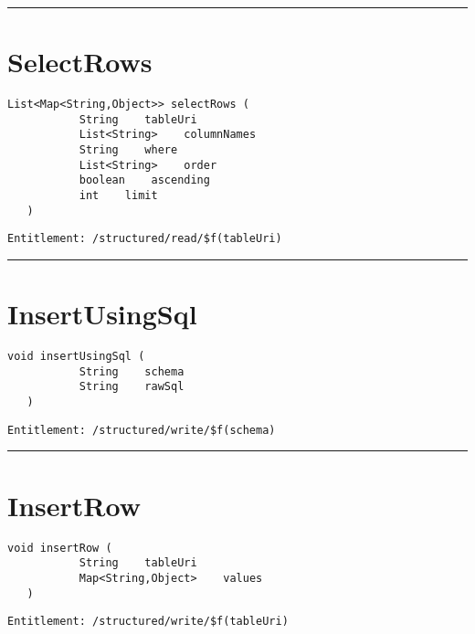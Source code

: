 \rule{12cm}{2pt}
\section{SelectRows}
\label{Api:SelectRows}
\begin{lstlisting}[style=nonumbers]
   List<Map<String,Object>> selectRows (
           String    tableUri
           List<String>    columnNames
           String    where
           List<String>    order
           boolean    ascending
           int    limit
   )
\end{lstlisting}
\begin{Verbatim}[formatcom=\color{Maroon}]
  Entitlement: /structured/read/$f(tableUri)
\end{Verbatim}



\rule{12cm}{2pt}
\section{InsertUsingSql}
\label{Api:InsertUsingSql}
\begin{lstlisting}[style=nonumbers]
   void insertUsingSql (
           String    schema
           String    rawSql
   )
\end{lstlisting}
\begin{Verbatim}[formatcom=\color{Maroon}]
  Entitlement: /structured/write/$f(schema)
\end{Verbatim}



\rule{12cm}{2pt}
\section{InsertRow}
\label{Api:InsertRow}
\begin{lstlisting}[style=nonumbers]
   void insertRow (
           String    tableUri
           Map<String,Object>    values
   )
\end{lstlisting}
\begin{Verbatim}[formatcom=\color{Maroon}]
  Entitlement: /structured/write/$f(tableUri)
\end{Verbatim}




